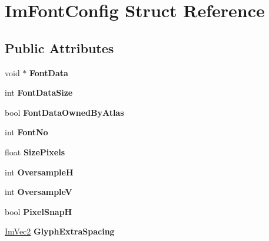 \hypertarget{struct_im_font_config}{}\section{Im\+Font\+Config Struct Reference}
\label{struct_im_font_config}
\subsection*{Public Attributes}
\begin{DoxyCompactItemize}
\item 
\mbox{\label{struct_im_font_config_a0265861de7ba7b0d953e1c97e7a50cf3}} 
void $\ast$ {\bfseries Font\+Data}
\item 
\mbox{\label{struct_im_font_config_a39df7ad3bb496421ce2cc5d2428345ef}} 
int {\bfseries Font\+Data\+Size}
\item 
\mbox{\label{struct_im_font_config_a99dfbf61ef79cee89b6f03e17cbe63b4}} 
bool {\bfseries Font\+Data\+Owned\+By\+Atlas}
\item 
\mbox{\label{struct_im_font_config_ab37ee3d5cf76000a4000e9296161e527}} 
int {\bfseries Font\+No}
\item 
\mbox{\label{struct_im_font_config_a2eff9cc7a11461414402f08ab910d277}} 
float {\bfseries Size\+Pixels}
\item 
\mbox{\label{struct_im_font_config_ab460df0d8019ffa8d124e8988c710910}} 
int {\bfseries OversampleH}
\item 
\mbox{\label{struct_im_font_config_a8018f84c60bfafb2b4629aeb77a047cb}} 
int {\bfseries OversampleV}
\item 
\mbox{\label{struct_im_font_config_a635b5fa03934467891fa949a037b5b89}} 
bool {\bfseries Pixel\+SnapH}
\item 
\mbox{\label{struct_im_font_config_a82db103689b1c434ec92875721967c07}} 
\hyperlink{struct_im_vec2}{Im\+Vec2} {\bfseries Glyph\+Extra\+Spacing}
\item 

\end{DoxyCompactItemize}
